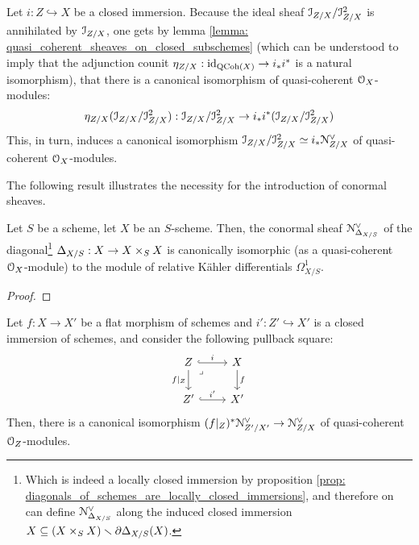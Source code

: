             \begin{remark}
                Let $i: Z \hookrightarrow X$ be a closed immersion. Because the ideal sheaf $\mathcal{I}_{Z/X}/\mathcal{I}_{Z/X}^2$ is annihilated by $\mathcal{I}_{Z/X}$, one gets by lemma \ref{lemma: quasi_coherent_sheaves_on_closed_subschemes} (which can be understood to imply that the adjunction counit $\eta_{Z/X}: \mathrm{id}_{\mathrm{QCoh}(X)} \to i_*i^*$ is a natural isomorphism), that there is a canonical isomorphism of quasi-coherent $\mathcal{O}_X$-modules:
                    $$\eta_{Z/X}(\mathcal{I}_{Z/X}/\mathcal{I}_{Z/X}^2): \mathcal{I}_{Z/X}/\mathcal{I}_{Z/X}^2 \to i_*i^*(\mathcal{I}_{Z/X}/\mathcal{I}_{Z/X}^2)$$
                This, in turn, induces a canonical isomorphism $\mathcal{I}_{Z/X}/\mathcal{I}_{Z/X}^2 \simeq i_*\mathcal{N}_{Z/X}^{\vee}$ of quasi-coherent $\mathcal{O}_X$-modules.
            \end{remark}
            The following result illustrates the necessity for the introduction of conormal sheaves. 
            \begin{proposition} \label{prop: conormal_sheaves_of_diagonals}
                \cite[\href{https://stacks.math.columbia.edu/tag/08S2}{Tag 08S2}]{stacks} Let $S$ be a scheme, let $X$ be an $S$-scheme. Then, the conormal sheaf $\mathcal{N}_{\Delta_{X/S}}^{\vee}$ of the diagonal\footnote{Which is indeed a locally closed immersion by proposition \ref{prop: diagonals_of_schemes_are_locally_closed_immersions}, and therefore on can define $\mathcal{N}_{\Delta_{X/S}}^{\vee}$ along the induced closed immersion $X \subseteq (X \x_S X) \setminus \del \Delta_{X/S}(X)$.} $\Delta_{X/S}: X \to X \x_S X$ is canonically isomorphic (as a quasi-coherent $\mathcal{O}_X$-module) to the module of relative K\"ahler differentials $\Omega^1_{X/S}$.
            \end{proposition}
                \begin{proof}
                    
                \end{proof}
            \begin{proposition} \label{prop: flat_base_changes_of_conormal_sheaves}
                Let $f: X \to X'$ be a flat morphism of schemes and $i': Z' \hookrightarrow X'$ is a closed immersion of schemes, and consider the following pullback square:
                    $$
                        \begin{tikzcd}
                        	Z & X \\
                        	{Z'} & {X'}
                        	\arrow["{f|_Z}"', from=1-1, to=2-1]
                        	\arrow["{i'}", hook, from=2-1, to=2-2]
                        	\arrow["f", from=1-2, to=2-2]
                        	\arrow["i", hook, from=1-1, to=1-2]
                        	\arrow["\lrcorner"{anchor=center, pos=0.125}, draw=none, from=1-1, to=2-2]
                        \end{tikzcd}
                    $$
                Then, there is a canonical isomorphism $(f|_Z)^* \mathcal{N}_{Z'/X'}^{\vee} \to \mathcal{N}_{Z/X}^{\vee}$ of quasi-coherent $\mathcal{O}_Z$-modules. 
            \end{proposition}
